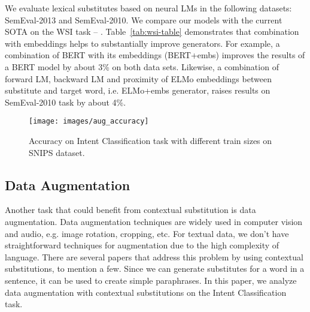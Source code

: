\documentclass[11pt,a4paper]{article}
\begin{document}
We evaluate lexical substitutes based on neural LMs in the following datasets: SemEval-2013 and SemEval-2010. We compare our models with the current SOTA on the WSI task -- \cite{amrami-2019}. Table~\ref{tab:wsi-table} demonstrates that combination with embeddings helps to substantially improve generators. For example, a combination of BERT with its embeddings (BERT+embs) improves the results of a BERT model by about 3\% on both data sets. Likewise, a combination of forward LM, backward LM and proximity of ELMo embeddings between substitute and target word, i.e. ELMo+embs generator, raises results on SemEval-2010 task by about 4\%.


\begin{figure}[!h]
    \centering
    \texttt{[image: images/aug\_accuracy]}
    \caption{Accuracy on Intent Classification task with different train sizes on SNIPS dataset.}
    \label{fig:aug-accuracy}
\end{figure}


\subsection{Data Augmentation}
Another task that could benefit from contextual substitution is data augmentation. Data augmentation techniques are widely used in computer vision and audio, e.g. image rotation, cropping, etc. %
For textual data, we don't have straightforward techniques for augmentation due to the high complexity of language. There are several papers that address this problem by using contextual substitutions, \cite{kobayashi-2018-contextual,gao-etal-2019-soft,DBLP:journals/corr/abs-1812-06705} to mention a few. Since we can generate substitutes for a word in a sentence, it can be used to create simple paraphrases. 
In this paper, we analyze data augmentation with contextual substitutions on the Intent Classification task.
\end{document}
